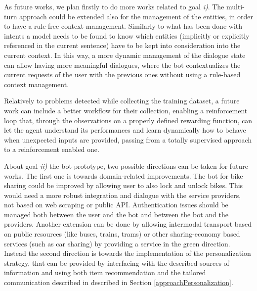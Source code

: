 As future works, we plan firstly to do more works related to goal \textit{i)}. The multi-turn approach could be extended also for the management of the entities, in order to have a rule-free context management. Similarly to what has been done with intents a model needs to be found to know which entities (implicitly or explicitly referenced in the current sentence) have to be kept into consideration into the current context. In this way, a more dynamic management of the dialogue state can allow having more meaningful dialogues, where the bot contextualizes the current requests of the user with the previous ones without using a rule-based context management.

Relatively to problems detected while collecting the training dataset, a future work can include a better workflow for their collection, enabling a reinforcement loop that, through the observations on a properly defined rewarding function, can let the agent understand its performances and learn dynamically how to behave when unexpected inputs are provided, passing from a totally supervised approach to a reinforcement enabled one.

About  goal \textit{ii)} the bot prototype, two possible directions can be taken for future works. The first one is towards domain-related improvements. The bot for bike sharing could be improved by allowing user to also lock and unlock bikes. This would need a more robust integration and dialogue with the service providers, not based on web scraping or public API. Authentication issues should be managed both between the user and the bot and between the bot and the providers. Another extension can be done by allowing intermodal transport based on public resources (like buses, trains, trams) or other sharing-economy based services (such as car sharing) by providing a service in the green direction. Instead the second direction is towards the implementation of the personalization strategy, that can be provided by interfacing with the described sources of information and using both item recommendation and the tailored communication described in described in Section \ref{approachPersonalization}.
